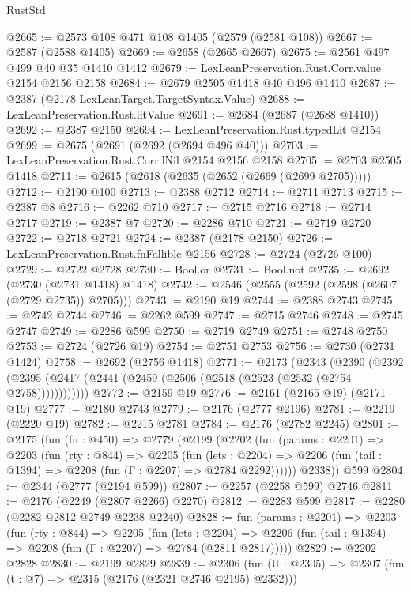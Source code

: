 \begin{lexlean}{RustStd}
\begin{coremodule}
{\begin{coremodule}
{{{{{{{{{{@2665 := @2573 @108 @471 @108 @1405 (@2579 (@2581 @108))
@2667 := @2587 (@2588 @1405)
@2669 := @2658 (@2665 @2667)
@2675 := @2561 @497 @499 @40 @35 @1410 @1412
@2679 := LexLeanPreservation.Rust.Corr.value @2154 @2156 @2158
@2684 := @2679 @2505 @1418 @40 @496 @1410
@2687 := @2387 (@2178 LexLeanTarget.TargetSyntax.Value)
@2688 := LexLeanPreservation.Rust.litValue
@2691 := @2684 (@2687 (@2688 @1410))
@2692 := @2387 @2150
@2694 := LexLeanPreservation.Rust.typedLit @2154
@2699 := @2675 (@2691 (@2692 (@2694 @496 @40)))
@2703 := LexLeanPreservation.Rust.Corr.lNil @2154 @2156 @2158
@2705 := @2703 @2505 @1418
@2711 := @2615 (@2618 (@2635 (@2652 (@2669 (@2699 @2705)))))
@2712 := @2190 @100
@2713 := @2388 @2712
@2714 := @2711 @2713
@2715 := @2387 @8
@2716 := @2262 @710
@2717 := @2715 @2716
@2718 := @2714 @2717
@2719 := @2387 @7
@2720 := @2286 @710
@2721 := @2719 @2720
@2722 := @2718 @2721
@2724 := @2387 (@2178 @2150)
@2726 := LexLeanPreservation.Rust.fnFallible @2156
@2728 := @2724 (@2726 @100)
@2729 := @2722 @2728
@2730 := Bool.or
@2731 := Bool.not
@2735 := @2692 (@2730 (@2731 @1418) @1418)
@2742 := @2546 (@2555 (@2592 (@2598 (@2607 (@2729 @2735)) @2705)))
@2743 := @2190 @19
@2744 := @2388 @2743
@2745 := @2742 @2744
@2746 := @2262 @599
@2747 := @2715 @2746
@2748 := @2745 @2747
@2749 := @2286 @599
@2750 := @2719 @2749
@2751 := @2748 @2750
@2753 := @2724 (@2726 @19)
@2754 := @2751 @2753
@2756 := @2730 (@2731 @1424)
@2758 := @2692 (@2756 @1418)
@2771 := @2173
    (@2343
      (@2390 (@2392 (@2395 (@2417 (@2441 (@2459 (@2506 (@2518 (@2523 (@2532 (@2754 @2758))))))))))))
@2772 := @2159 @19
@2776 := @2161 (@2165 @19) (@2171 @19)
@2777 := @2180 @2743
@2779 := @2176 (@2777 @2196)
@2781 := @2219 (@2220 @19)
@2782 := @2215 @2781
@2784 := @2176 (@2782 @2245)
@2801 := @2175
    (fun (fn : @450) =>
    @2779
      (@2199
        (@2202
          (fun (params : @2201) =>
          @2203
            (fun (rty : @844) =>
            @2205
              (fun (lets : @2204) =>
              @2206 (fun (tail : @1394) => @2208 (fun (Γ : @2207) => @2784 @2292))))))
        @2338))
    @599
@2804 := @2344 (@2777 (@2194 @599))
@2807 := @2257 (@2258 @599) @2746
@2811 := @2176 (@2249 (@2807 @2266) @2270)
@2812 := @2283 @599
@2817 := @2280 (@2282 @2812 @2749 @2238 @2240)
@2828 := fun (params : @2201) =>
  @2203
    (fun (rty : @844) =>
    @2205
      (fun (lets : @2204) =>
      @2206 (fun (tail : @1394) => @2208 (fun (Γ : @2207) => @2784 (@2811 @2817)))))
@2829 := @2202 @2828
@2830 := @2199 @2829
@2839 := @2306 (fun (U : @2305) => @2307 (fun (t : @7) => @2315 (@2176 (@2321 @2746 @2195) @2332)))
}}}}}}}}}}
\end{coremodule}}
\end{coremodule}
\end{lexlean}
